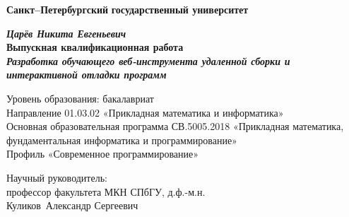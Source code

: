 
\begin{titlepage}
\begin{center}

\textbf{Санкт--Петербургский}
\textbf{государственный университет}

\vspace{35mm}

\textbf{\textit{\large Царёв Никита Евгеньевич}} \\[8mm]
\textbf{\large Выпускная квалификационная работа}\\[3mm]
\textbf{\textit{\large Разработка обучающего веб-инструмента удаленной сборки и интерактивной отладки программ}}

\vspace{20mm}
Уровень образования: бакалавриат\\
Направление 01.03.02 «Прикладная математика и информатика»\\
Основная образовательная программа СВ.5005.2018
«Прикладная математика, фундаментальная информатика и программирование»\\
Профиль «Современное программирование»

\vspace{7mm}

\begin{flushright}
\begin{minipage}[t]{0.67\textwidth}
{Научный руководитель:} \\
профессор факультета МКН СПбГУ, д.ф.-м.н. \\ Куликов~Александр Сергеевич


\end{minipage}
\end{flushright}
\end{center}
\end{titlepage}
